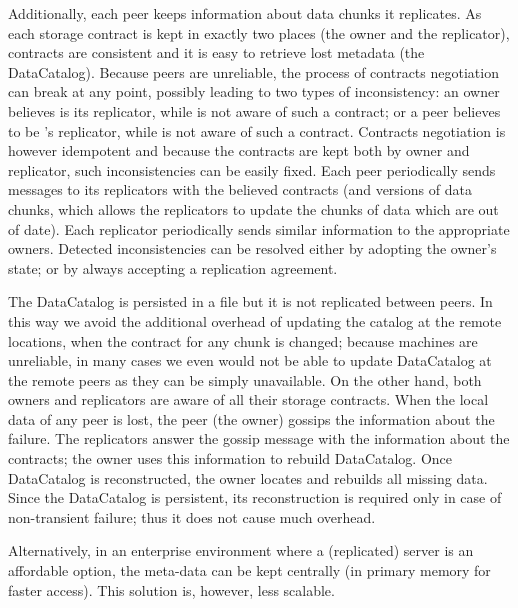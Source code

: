 \documentclass[10pt, final, conference, letterpaper]{IEEEtran}
\begin{document}
Additionally, each peer keeps information about data chunks it replicates. 
As each storage contract is kept in exactly two places (the owner and the replicator), contracts are consistent and it is easy to retrieve lost metadata (the DataCatalog). 
Because peers are unreliable, the process of contracts negotiation can break at any point, possibly leading to two types of inconsistency: an owner  believes  is its replicator, while  is not aware of such a contract; or a peer  believes to be 's replicator, while  is not aware of such a contract. Contracts negotiation is however idempotent and because the contracts are kept both by owner and replicator, such inconsistencies can be easily fixed. Each peer periodically sends messages to its replicators with the believed contracts (and versions of data chunks, which allows the replicators to update the chunks of data which are out of date). Each replicator periodically sends similar information to the appropriate owners. Detected inconsistencies can be resolved either by adopting the owner's state; or by always accepting a replication agreement.

The DataCatalog is persisted in a file but it is not replicated between peers. In this way we avoid the additional overhead of updating the catalog at the remote locations, when the contract for any chunk is changed; because machines are unreliable, in many cases we even would not be able to update DataCatalog at the remote peers as they can be simply unavailable. On the other hand, both owners and replicators are aware of all their storage contracts. When the local data of any peer is lost, the peer (the owner) gossips the information about the failure.  The replicators answer the gossip message with the information about the contracts; the owner uses this information to rebuild DataCatalog. Once DataCatalog is reconstructed, the owner locates and rebuilds all missing data. Since the DataCatalog is persistent, its reconstruction is required only in case of non-transient failure; thus it does not cause much overhead.

Alternatively, in an enterprise environment where a (replicated) server is an affordable option, the meta-data can be kept centrally (in primary memory for faster access). This solution is, however, less scalable.
\end{document}
